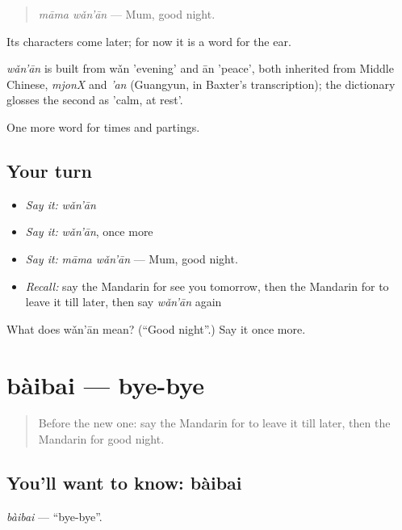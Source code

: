 \begin{quote}
\emph{māma wǎn'ān} — Mum, good night.
\end{quote}

Its characters come later; for now it is a word for the ear.

\begin{cousinweb}
\emph{wǎn'ān} is built from wǎn 'evening' and ān 'peace', both inherited from Middle Chinese, \emph{mjonX} and \emph{'an} (Guangyun, in Baxter's transcription); the dictionary glosses the second as 'calm, at rest'.
\end{cousinweb}

\begin{grammarlens}[title={What you've built}]
One more word for times and partings.
\end{grammarlens}

\subsection*{Your turn}
\begin{itemize}
\raggedright
  \item \emph{Say it:} \emph{wǎn'ān}
  \item \emph{Say it:} \emph{wǎn'ān}, once more
  \item \emph{Say it:} \emph{māma wǎn'ān} — Mum, good night.
  \item \emph{Recall:} say the Mandarin for see you tomorrow, then the Mandarin for to leave it till later, then say \emph{wǎn'ān} again
\end{itemize}

\begin{tcolorbox}[breakable,colback=teal!4,colframe=teal!35!black,title={Before you move on}]
What does wǎn'ān mean? (\textquotedblleft{}Good night\textquotedblright{}.) Say it once more.
\end{tcolorbox}
\section[bàibai]{bàibai — bye-bye}

\label{lesson:ZH-C76-baibai}



\begin{quote}
Before the new one: say the Mandarin for to leave it till later, then the Mandarin for good night.
\end{quote}

\subsection*{You'll want to know: bàibai}
\emph{bàibai} — \textquotedblleft{}bye-bye\textquotedblright{}.

